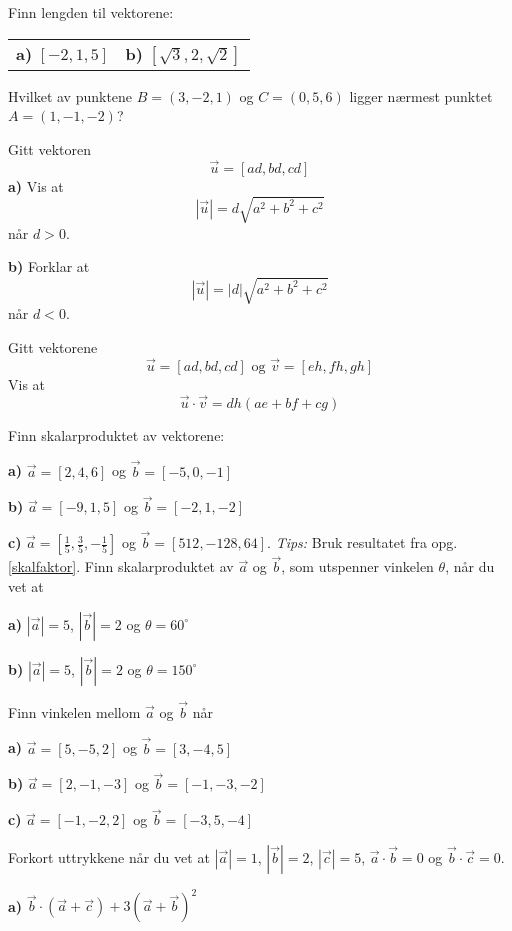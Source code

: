 




\opgt

\nes
{}
Finn lengden til vektorene:\os
\begin{tabular}{@{}l l}
\textbf{a)} $ [-2, 1, 5] $ & \quad\textbf{b)} $ [\sqrt{3}, 2,  \sqrt{2}] $
\end{tabular}	
	
Hvilket av punktene $ {B=(3, -2, 1)} $ og $ {C=(0, 5, 6) }$ ligger nærmest punktet $ {A=(1, -1, -2)} $?

Gitt vektoren
\[ \vec{u}=[ad, bd, cd]\]
\textbf{a)} Vis at
\[ |\vec{u}|=d\sqrt{a^2 + b^2 + c^2} \]
når $ d>0 $.\os

\textbf{b)} Forklar at
\[ |\vec{u}|=|d|\sqrt{a^2 + b^2 + c^2} \]
når $ d<0 $.

\nes
{}
Gitt vektorene
\[ \vec{u}=[ad, bd, cd] \text{ og } \vec{v}=[eh, fh, gh] \]
Vis at
\[ \vec{u}\cdot\vec{v}=dh(ae+bf+cg) \] \vs

Finn skalarproduktet av vektorene:\os

\textbf{a)} $ \vec{a}=[2, 4, 6] $ og $ \vec{b}=[-5, 0, -1] $\os 

\textbf{b)} $ \vec{a}=[-9, 1, 5] $ og $\vec{b}= [-2, 1, -2] $\os

\textbf{c)} $ \vec{a}=\left[\frac{1}{5}, \frac{3}{5},- \frac{1}{5}\right] $ og $ \vec{b}=[512, -128, 64] $. \textsl{Tips:} Bruk resultatet fra opg. \ref{skalfaktor}.
\newpage
{}
Finn skalarproduktet av $ \vec{a} $ og $ \vec{b} $, som utspenner vinkelen $ \theta $, når du vet at\os

\textbf{a)} $ |\vec{a}|=5 $, $ |\vec{b}|= 2$ og $ \theta = 60^\circ $\os

\textbf{b)} $ |\vec{a}|=5 $, $ |\vec{b}|= 2$ og $ \theta = 150^\circ $

Finn vinkelen mellom $ \vec{a} $ og $ \vec{b} $ når\os

\textbf{a)} $ \vec{a}=[ 5 ,-5,  2]$ og $ \vec{b}=[ 3 ,-4 , 5] $\os

\textbf{b)} $ \vec{a}=[ 2 ,-1,  -3]$ og $ \vec{b}=[ -1 ,-3 , -2] $\os

\textbf{c)} $ \vec{a}=[ -1 ,-2,  2]$ og $ \vec{b}=[ -3 , 5 , -4] $

Forkort uttrykkene når du vet at $ |\vec{a}|=1 $, $ |\vec{b}|=2 $, $ |\vec{c}|=5 $, $ \vec{a}\cdot\vec{b}=0 $ og $ \vec{b}\cdot\vec{c}=0 $.\os

\textbf{a)} $ \vec{b}\cdot(\vec{a}+\vec{c}) + 3(\vec{a}+\vec{b})^2 $ \os


